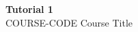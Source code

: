 \documentclass[12pt]{article}
\begin{document}
\begin{center}
  {\LARGE\bfseries Tutorial 1}\\[0.25em]
  {\large COURSE-CODE Course Title}\\[0.15em]
\end{center}

\end{document}
